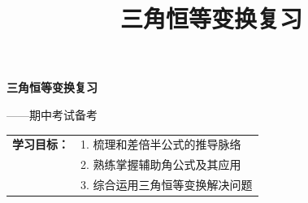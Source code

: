 \documentclass[UTF8,10pt,aspectratio=169]{ctexbeamer}
\title{三角恒等变换复习}
\author{}
\date{}
\begin{document}
	
	\begin{frame}
		\begin{center}
			\vspace{1.5cm}
			{\Large \textbf{三角恒等变换复习}}
			
			\vspace{0.8cm}
			{\large ——期中考试备考}
			
			\vspace{2cm}
			\begin{tabular}{rl}
				\textbf{学习目标：} & 1. 梳理和差倍半公式的推导脉络 \\
				& 2. 熟练掌握辅助角公式及其应用 \\
				& 3. 综合运用三角恒等变换解决问题 \\
			\end{tabular}
		\end{center}
	\end{frame}
	
\end{document}
